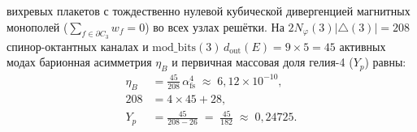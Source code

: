 \begin{theorem}[Затравочное состояние Каталана $\mathrm{IV}(3) = 263$, первое рождение вихря на такте $t = 2$, три теоремы абляции, бариогенезис $\eta_B$ и первичный нуклеосинтез $Y_p = 45/182$]
\begin{enumerate}[label=\textbf{(\arabic*)},leftmargin=*]
\begin{equation}
  \end{equation}
  вихревых плакетов с тождественно нулевой кубической дивергенцией магнитных монополей ($\sum_{f\in\partial C_3} w_f = 0$) во всех узлах решётки. На $2 N_\varphi(3) |{\triangle}(3)| = 208$ спинор-октантных каналах и $\mathrm{mod\_bits}(3)\,d_{\mathrm{out}}(E) = 9\times 5 = 45$ активных модах барионная асимметрия $\eta_B$ и первичная массовая доля гелия-4 ($Y_p$) равны:
  \begin{align}
    \eta_B &= \frac{45}{208}\,\alpha_{\mathrm{fs}}^4 \;\approx\; 6{,}12\times 10^{-10}, \label{eq:mono-eta-b} \\
    208 &= 4 \times 45 + 28, \label{eq:mono-bbn-div} \\
    Y_p &= \frac{45}{208 - 26} \;=\; \frac{45}{182} \;\approx\; 0{,}24725. \label{eq:mono-eta-b-bbn-yp}
  \end{align}
\end{enumerate}
\end{theorem}

